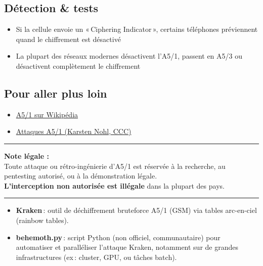 \documentclass[
  french,
]{article}
\providecommand{\tightlist}{%
  \setlength{\itemsep}{0pt}\setlength{\parskip}{0pt}}
\begin{document}
\subsection{Détection \& tests}\label{duxe9tection-tests}

\begin{itemize}
\tightlist
\item
  Si la cellule envoie un «\,Ciphering Indicator\,», certains téléphones
  préviennent quand le chiffrement est désactivé
\item
  La plupart des réseaux modernes désactivent l'A5/1, passent en A5/3 ou
  désactivent complètement le chiffrement
\end{itemize}

\subsection{Pour aller plus loin}\label{pour-aller-plus-loin}

\begin{itemize}
\tightlist
\item
  \href{https://en.wikipedia.org/wiki/A5/1}{A5/1 sur Wikipédia}
\item
  \href{https://media.ccc.de/v/27c3-3894-en-breaking_gsm_with_rainbow_tables}{Attaques
  A5/1 (Karsten Nohl, CCC)}
\end{itemize}

\begin{center}\rule{0.5\linewidth}{0.5pt}\end{center}

\textbf{Note légale :}\\
Toute attaque ou rétro-ingénierie d'A5/1 est réservée à la recherche, au
pentesting autorisé, ou à la démonstration légale.\\
\textbf{L'interception non autorisée est illégale} dans la plupart des
pays.

\begin{center}\rule{0.5\linewidth}{0.5pt}\end{center}

\begin{itemize}
\tightlist
\item
  \textbf{Kraken}\,: outil de déchiffrement bruteforce A5/1 (GSM) via
  tables arc-en-ciel (rainbow tables).
\item
  \textbf{behemoth.py}\,: script Python (non officiel, communautaire)
  pour automatiser et paralléliser l'attaque Kraken, notamment sur de
  grandes infrastructures (ex\,: cluster, GPU, ou tâches batch).
\end{itemize}
\end{document}
